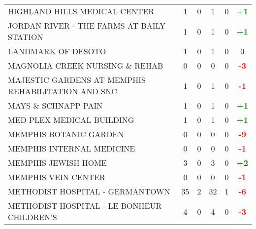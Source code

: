 \documentclass{article}
\begin{document}
\begin{longtable}{l|cccc|c}
    
        HIGHLAND HILLS MEDICAL CENTER & 1 & 0 & 1 & 0 & \textcolor{green}{\textbf{+1}} \\
    

    
        JORDAN RIVER - THE FARMS AT BAILY STATION & 1 & 0 & 1 & 0 & \textcolor{green}{\textbf{+1}} \\
    

    
        LANDMARK OF DESOTO & 1 & 0 & 1 & 0 & 0 \\
    

    
        MAGNOLIA CREEK NURSING \& REHAB & 0 & 0 & 0 & 0 & \textcolor{red}{\textbf{-3}} \\
    

    
        MAJESTIC GARDENS AT MEMPHIS REHABILITATION AND SNC & 1 & 0 & 1 & 0 & \textcolor{red}{\textbf{-1}} \\
    

    
        MAYS \& SCHNAPP PAIN & 1 & 0 & 1 & 0 & \textcolor{green}{\textbf{+1}} \\
    

    
        MED PLEX MEDICAL BUILDING & 1 & 0 & 1 & 0 & \textcolor{green}{\textbf{+1}} \\
    

    
        MEMPHIS BOTANIC GARDEN & 0 & 0 & 0 & 0 & \textcolor{red}{\textbf{-9}} \\
    

    
        MEMPHIS INTERNAL MEDICINE & 0 & 0 & 0 & 0 & \textcolor{red}{\textbf{-1}} \\
    

    
        MEMPHIS JEWISH HOME & 3 & 0 & 3 & 0 & \textcolor{green}{\textbf{+2}} \\
    

    
        MEMPHIS VEIN CENTER & 0 & 0 & 0 & 0 & \textcolor{red}{\textbf{-1}} \\
    

    
        METHODIST HOSPITAL - GERMANTOWN & 35 & 2 & 32 & 1 & \textcolor{red}{\textbf{-6}} \\
    

    
        METHODIST HOSPITAL - LE BONHEUR CHILDREN'S & 4 & 0 & 4 & 0 & \textcolor{red}{\textbf{-3}} \\
    


\end{longtable}
\end{document}
